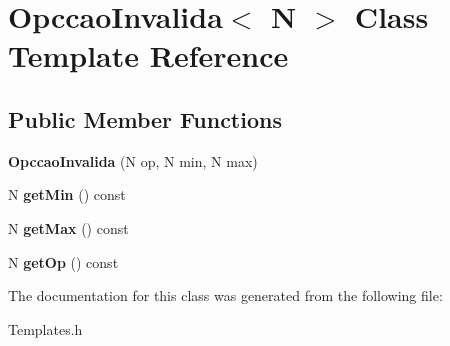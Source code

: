\hypertarget{class_opccao_invalida}{}\section{Opccao\+Invalida$<$ N $>$ Class Template Reference}
\label{class_opccao_invalida}
\subsection*{Public Member Functions}
\begin{DoxyCompactItemize}
\item 
\hypertarget{class_opccao_invalida_a19b191db4d1cc8c074c24a940571dd4b}{}{\bfseries Opccao\+Invalida} (N op, N min, N max)\label{class_opccao_invalida_a19b191db4d1cc8c074c24a940571dd4b}

\item 
\hypertarget{class_opccao_invalida_abac2e9c809f6b1dc5e0179e28604f528}{}N {\bfseries get\+Min} () const \label{class_opccao_invalida_abac2e9c809f6b1dc5e0179e28604f528}

\item 
\hypertarget{class_opccao_invalida_a98bb7934220a9b27b9da823207b72db3}{}N {\bfseries get\+Max} () const \label{class_opccao_invalida_a98bb7934220a9b27b9da823207b72db3}

\item 
\hypertarget{class_opccao_invalida_ac9afa1ee68970cddd39a9873fd2c357f}{}N {\bfseries get\+Op} () const \label{class_opccao_invalida_ac9afa1ee68970cddd39a9873fd2c357f}

\end{DoxyCompactItemize}


The documentation for this class was generated from the following file\+:\begin{DoxyCompactItemize}
\item 
Templates.\+h\end{DoxyCompactItemize}
